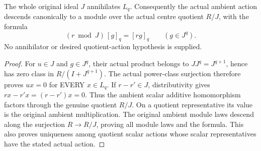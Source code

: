 \begin{lemma}
\label{hir:relative-normal-actual-layer-centre-scalars}
\leanok
The whole original ideal $J$ annihilates $L_q$.  Consequently the actual
ambient action descends canonically to a module over the actual centre
quotient $R/J$, with the formula
\[
 (r\bmod J)\,[g]_q=[rg]_q\qquad(g\in J^q).
\]
No annihilator or desired quotient-action hypothesis is supplied.
\end{lemma}
\begin{proof}
For $u\in J$ and $g\in J^q$, their actual product belongs to
$J J^q=J^{q+1}$, hence has zero class in $R/(I+J^{q+1})$.
The actual power-class surjection therefore proves $u x=0$ for EVERY
$x\in L_q$.  If $r-r'\in J$, distributivity gives
$rx-r'x=(r-r')x=0$.  Thus the ambient scalar additive homomorphism factors
through the genuine quotient $R/J$.  On a quotient representative its
value is the original ambient multiplication.  The original ambient
module laws descend along the surjection $R\to R/J$, proving all module
laws and the formula.  This also proves uniqueness among quotient scalar
actions whose scalar representatives have the stated actual action.
\end{proof}

